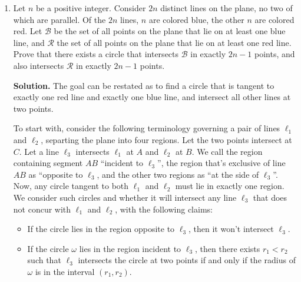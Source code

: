 \documentclass[11pt,a4paper]{article}
\begin{document}
\begin{enumerate}
	\item Let $n$ be a positive integer. Consider $2n$ distinct lines on the plane, no two of which are parallel. Of the $2n$ lines, $n$ are colored blue, the other $n$ are colored red. Let $\mathcal{B}$ be the set of all points on the plane that lie on at least one blue line, and $\mathcal{R}$ the set of all points on the plane that lie on at least one red line. Prove that there exists a circle that intersects $\mathcal{B}$ in exactly $2n - 1$ points, and also intersects $\mathcal{R}$ in exactly $2n - 1$ points.
	
	\textbf{Solution.} The goal can be restated as to find a circle that is tangent to exactly one red line and exactly one blue line, and intersect all other lines at two points. 
	
	To start with, consider the following terminology governing a pair of lines $\ell_1$ and $\ell_2$, separting the plane into four regions. Let the two points intersect at $C$. Let a line $\ell_3$ intersects $\ell_1$ at $A$ and $\ell_2$ at $B$. We call the region containing segment $AB$ ``incident to $\ell_3$'', the region that's exclusive of line $AB$ as ``opposite to $\ell_3$, and the other two regions as ``at the side of $\ell_3$''.  Now, any circle tangent to both $\ell_1$ and $\ell_2$ must lie in exactly one region. We consider such circles and whether it will intersect any line $\ell_3$ that does not concur with $\ell_1$ and $\ell_2$, with the following claims: 
	\begin{itemize}
		\item If the circle lies in the region opposite to $\ell_3$, then it won't intersect $\ell_3$. 
		
		\item If the circle $\omega$ lies in the region incident to $\ell_3$, then there exists $r_1<r_2$ such that $\ell_3$ intersects the circle at two points if and only if the radius of $\omega$ is in the interval $(r_1, r_2)$. 
		

\end{itemize}
\end{enumerate}
\end{document}

